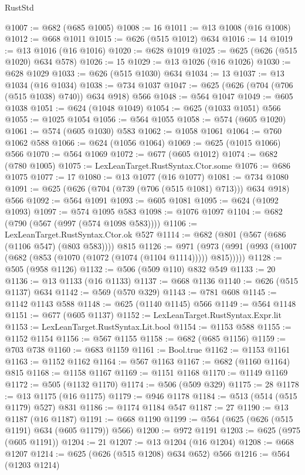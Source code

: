 \begin{lexlean}{RustStd}
\begin{coremodule}
{\begin{coremodule}
{{{{{{{{{{{{{{{@1007 := @682 (@685 @1005)
@1008 := 16
@1011 := @13 @1008 (@16 @1008)
@1012 := @668 @1011
@1015 := @626 (@515 @1012) @634
@1016 := 14
@1019 := @13 @1016 (@16 @1016)
@1020 := @628 @1019
@1025 := @625 (@626 (@515 @1020) @634 @578)
@1026 := 15
@1029 := @13 @1026 (@16 @1026)
@1030 := @628 @1029
@1033 := @626 (@515 @1030) @634
@1034 := 13
@1037 := @13 @1034 (@16 @1034)
@1038 := @734 @1037
@1047 := @625 (@626 (@704 (@706 (@515 @1038) @740)) @634 @918) @566
@1048 := @564 @1047
@1049 := @605 @1038
@1051 := @624 (@1048 @1049)
@1054 := @625 (@1033 @1051) @566
@1055 := @1025 @1054
@1056 := @564 @1055
@1058 := @574 (@605 @1020)
@1061 := @574 (@605 @1030) @583
@1062 := @1058 @1061
@1064 := @760 @1062 @588
@1066 := @624 (@1056 @1064)
@1069 := @625 (@1015 @1066) @566
@1070 := @564 @1069
@1072 := @677 (@605 @1012)
@1074 := @682 (@780 @1005)
@1075 := LexLeanTarget.RustSyntax.Ctor.some
@1076 := @686 @1075
@1077 := 17
@1080 := @13 @1077 (@16 @1077)
@1081 := @734 @1080
@1091 := @625 (@626 (@704 (@739 (@706 (@515 @1081) @713))) @634 @918) @566
@1092 := @564 @1091
@1093 := @605 @1081
@1095 := @624 (@1092 @1093)
@1097 := @574 @1095 @583
@1098 := @1076 @1097
@1104 := @682 (@790 (@567 (@997 (@574 @1098 @583))))
@1106 := LexLeanTarget.RustSyntax.Ctor.ok @527
@1114 := @682 (@801 (@567 (@686 (@1106 @547) (@803 @583)))) @815
@1126 := @971 (@973 (@991 (@993 (@1007 (@682 (@853 (@1070 (@1072 (@1074 (@1104 @1114))))) @815)))))
@1128 := @505 (@958 @1126)
@1132 := @506 (@509 @110) @832 @549
@1133 := 20
@1136 := @13 @1133 (@16 @1133)
@1137 := @668 @1136
@1140 := @626 (@515 @1137) @634
@1142 := @569 (@570 @329)
@1143 := @781 @608
@1145 := @1142 @1143 @588
@1148 := @625 (@1140 @1145) @566
@1149 := @564 @1148
@1151 := @677 (@605 @1137)
@1152 := LexLeanTarget.RustSyntax.Expr.lit
@1153 := LexLeanTarget.RustSyntax.Lit.bool
@1154 := @1153 @588
@1155 := @1152 @1154
@1156 := @567 @1155
@1158 := @682 (@685 @1156)
@1159 := @703 @738
@1160 := @683 @1159
@1161 := Bool.true
@1162 := @1153 @1161
@1163 := @1152 @1162
@1164 := @567 @1163
@1167 := @682 (@1160 @1164) @815
@1168 := @1158 @1167
@1169 := @1151 @1168
@1170 := @1149 @1169
@1172 := @505 (@1132 @1170)
@1174 := @506 (@509 @329)
@1175 := 28
@1178 := @13 @1175 (@16 @1175)
@1179 := @946 @1178
@1184 := @513 (@514 (@515 @1179) @527) @831
@1186 := @1174 @1184 @547
@1187 := 27
@1190 := @13 @1187 (@16 @1187)
@1191 := @668 @1190
@1199 := @564 (@625 (@626 (@515 @1191) @634 (@605 @1179)) @566)
@1200 := @972 @1191
@1203 := @625 (@975 (@605 @1191))
@1204 := 21
@1207 := @13 @1204 (@16 @1204)
@1208 := @668 @1207
@1214 := @625 (@626 (@515 @1208) @634 @652) @566
@1216 := @564 (@1203 @1214)
}}}}}}}}}}}}}}}
\end{coremodule}}
\end{coremodule}
\end{lexlean}
